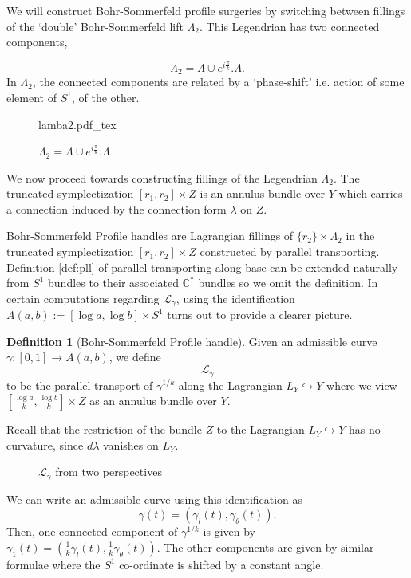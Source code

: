 \documentclass[11pt, oneside,dvipsnames]{amsart}
\newcommand{\incfig}[2]{
   
        \def\svgscale{#1}
    {#2.pdf_tex}
      
      
  
 }
\renewcommand{\to}{\rightarrow}
\renewcommand{\to}{\rightarrow}
\newcommand{\<}{\langle}
\renewcommand{\>}{\rangle}
\newcommand{\bC}{\mathbb{C}}
\newcommand{\cL}{\mathcal{L}}
\renewcommand{\to}{\rightarrow}
\theoremstyle{definition}
\theoremstyle{definition}
\newtheorem{defn}[Theorem]{Definition}
\numberwithin{equation}{subsection}
\begin{document}
We will construct Bohr-Sommerfeld profile surgeries by switching between fillings of the `double' Bohr-Sommerfeld lift $\Lambda_2$.  This Legendrian has two connected components, 

$$\Lambda_2 = \Lambda \cup e^{i\frac{\pi }{k}}.\Lambda.$$
In $\Lambda_2$, the connected components are related by a `phase-shift' i.e. action of some element of $S^1$,  of the other. 
\begin{figure}[ht]
    \centering
   \incfig{1}{lamba2}
    \caption{$\Lambda_2 = \Lambda \cup e^{i\frac{\pi }{k}}.\Lambda$}
    \label{fig:lagangle}
\end{figure}

We now proceed towards constructing fillings of the Legendrian $\Lambda_2$. The truncated symplectization $[r_1, r_2] \times Z$ is an annulus bundle over $Y$ which carries a connection induced by the connection form $\lambda$ on $Z$.

Bohr-Sommerfeld Profile handles are Lagrangian fillings of  $\{r_2\} \times \Lambda_2$ in the truncated symplectization $[r_1, r_2] \times Z$ constructed by parallel transporting. Definition \ref{def:pll} of parallel transporting along base can be extended naturally from $S^1$ bundles to their associated $\bC^*$ bundles so we omit the definition. 
In certain computations regarding $\cL_\gamma$, using the identification $A(a,b) := [\log a, \log b] \times S^1$ turns out to provide a clearer picture.

\begin{defn}[Bohr-Sommerfeld Profile handle]\label{def:Bsphand}
    Given an admissible curve $\gamma : [0,1] \to A(a,b)$, we define $$\cL_\gamma$$ to be the parallel transport of $\gamma^{1/k}$ along the Lagrangian $L_Y\hookrightarrow Y$ where we view $[\frac {\log a}{k},\frac {\log b}{k}  ] \times Z$ as an annulus bundle over $Y$.
\end{defn}
Recall that the restriction of the bundle $Z$ to the Lagrangian $L_Y\hookrightarrow Y$ has no curvature, since  $d\lambda$ vanishes on $L_Y$.

\begin{figure}[ht]
    \makebox[\textwidth][c]{\incfig{1.3}{laghann}}
    \caption{$\cL_\gamma$ from two perspectives}
\end{figure}
 We can write an admissible curve using this identification as $$\gamma(t) = (\gamma_l (t),\gamma_\theta (t)).$$ Then, one connected component of $\gamma^{1/k}$ is given by $\gamma_1 (t)  = (\frac{1}{k}\gamma_l (t),\frac{1}{k}\gamma_\theta (t))$. The other components are given by similar formulae where the $S^1$ co-ordinate is shifted by a constant angle.
\end{document}
